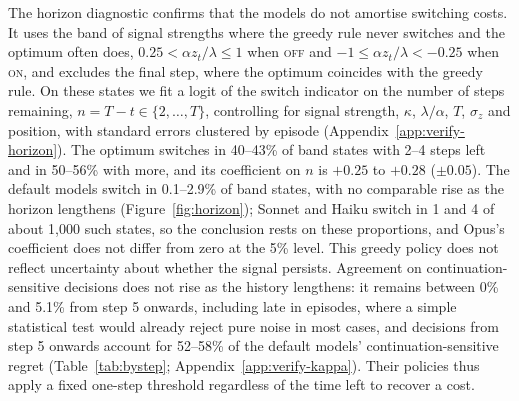 \documentclass[10pt,a4paper,twocolumn]{article}
\newcommand{\ON}{\textsc{on}}
\newcommand{\OFF}{\textsc{off}}
\newcommand{\sigz}{\sigma_z}
\begin{document}
The horizon diagnostic confirms that the models do not amortise switching costs. It uses the band of signal strengths where the greedy rule never switches and the optimum often does, $0.25<\alpha z_t/\lambda\le1$ when \OFF{} and $-1\le\alpha z_t/\lambda<-0.25$ when \ON{}, and excludes the final step, where the optimum coincides with the greedy rule. On these states we fit a logit of the switch indicator on the number of steps remaining, $n=T-t\in\{2,\dots,T\}$, controlling for signal strength, $\kappa$, $\lambda/\alpha$, $T$, $\sigz$ and position, with standard errors clustered by episode (Appendix~\ref{app:verify-horizon}). The optimum switches in 40--43\% of band states with 2--4 steps left and in 50--56\% with more, and its coefficient on $n$ is $+0.25$ to $+0.28$ ($\pm0.05$). The default models switch in 0.1--2.9\% of band states, with no comparable rise as the horizon lengthens (Figure~\ref{fig:horizon}); Sonnet and Haiku switch in 1 and 4 of about 1{,}000 such states, so the conclusion rests on these proportions, and Opus's coefficient does not differ from zero at the 5\% level. This greedy policy does not reflect uncertainty about whether the signal persists. Agreement on continuation-sensitive decisions does not rise as the history lengthens: it remains between 0\% and 5.1\% from step 5 onwards, including late in episodes, where a simple statistical test would already reject pure noise in most cases, and decisions from step 5 onwards account for 52--58\% of the default models' continuation-sensitive regret (Table~\ref{tab:bystep}; Appendix~\ref{app:verify-kappa}). Their policies thus apply a fixed one-step threshold regardless of the time left to recover a cost.
\end{document}
